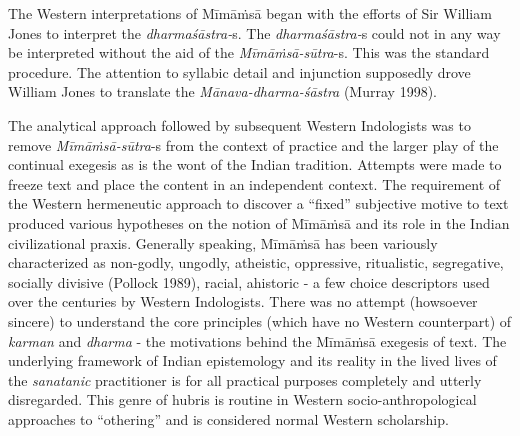 The Western interpretations of Mīmāṁsā began with the efforts of Sir William Jones to interpret the \textit{dharmaśāstra-}s. The \textit{dharmaśāstra-}s could not in any way be interpreted without the aid of the \textit{Mīmāṁsā-sūtra}-s. This was the standard procedure. The attention to syllabic detail and injunction supposedly drove William Jones to translate the \textit{Mānava-dharma-śāstra} (Murray 1998).

The analytical approach followed by subsequent Western Indologists was to remove \textit{Mīmāṁsā-sūtra}-s from the context of practice and the larger play of the continual exegesis as is the wont of the Indian tradition. Attempts were made to freeze text and place the content in an independent context. The requirement of the Western hermeneutic approach to discover a “fixed” subjective motive to text produced various hypotheses on the notion of Mīmāṁsā and its role in the Indian civilizational praxis. Generally speaking, Mīmāṁsā has been variously characterized as non-godly, ungodly, atheistic, oppressive, ritualistic, segregative, socially divisive (Pollock 1989), racial, ahistoric - a few choice descriptors used over the centuries by Western Indologists. There was no attempt (howsoever sincere) to understand the core principles (which have no Western counterpart) of \textit{karman} and \textit{dharma} - the motivations behind the Mīmāṁsā exegesis of text. The underlying framework of Indian epistemology and its reality in the lived lives of the \textit{sanatanic} practitioner is for all practical purposes completely and utterly disregarded. This genre of hubris is routine in Western socio-anthropological approaches to “othering” and is considered normal Western scholarship.

